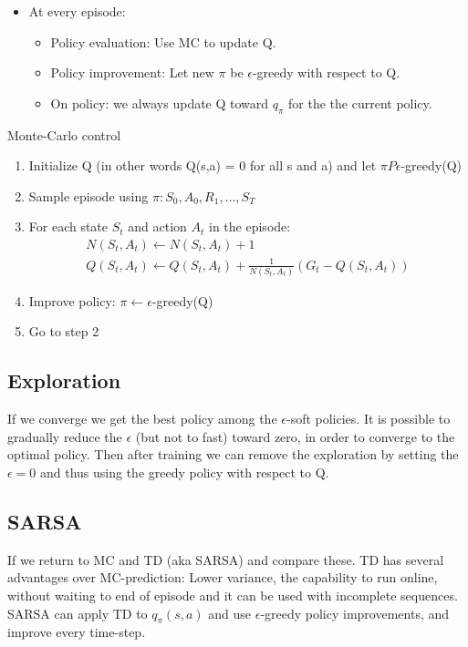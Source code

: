 \begin{itemize}
	\item At every episode:
	\begin{itemize}
		\item Policy evaluation: Use MC to update Q.
		\item Policy improvement: Let new $\pi$ be $\epsilon$-greedy with respect to Q.
		\item On policy: we always update Q toward $q_\pi$ for the the current policy.
	\end{itemize}
\end{itemize}

\begin{wbox}{Monte-Carlo control}
	\begin{enumerate}
		\item Initialize Q (in other words Q(s,a) = 0 for all s and a) and let $\pi P \epsilon$-greedy(Q)
		\item Sample episode using $\pi: S_0,A_0,R_1,\ldots,S_T$
		\item For each state $S_t$ and action $A_t$ in the episode:
			\begin{equation}
			\begin{aligned}
				N(S_t,A_t) \leftarrow N(S_t,A_t)+1 \\
				Q(S_t,A_t) \leftarrow Q(S_t,A_t) + \frac{1} {N(S_t,A_t)}(G_t - Q(S_t,A_t)) 
			\end{aligned}
			\end{equation}
		\item Improve policy: $\pi \leftarrow \epsilon$-greedy(Q)
		\item Go to step 2 
	\end{enumerate}
\end{wbox}

\subsection*{Exploration}
If we converge we get the best policy among the $\epsilon$-soft policies. It is possible to gradually reduce the $\epsilon$ (but not to fast) toward zero, in order to converge to the optimal policy. Then after training we can remove the exploration by setting the $\epsilon = 0$ and thus using the greedy policy with respect to Q. 

\subsection*{SARSA}
If we return to MC and TD (aka SARSA) and compare these. TD has several advantages over MC-prediction: Lower variance, the capability to run online, without waiting to end of episode and it can be used with incomplete sequences. SARSA can apply TD to $q_\pi(s,a)$ and use $\epsilon$-greedy policy improvements, and improve every time-step. 

